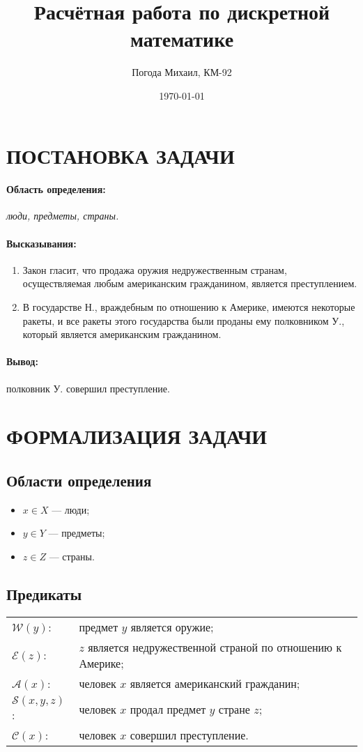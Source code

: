 \documentclass[titlepage,10pt,a4paper]{article}
\title{Расчётная работа по дискретной математике}
\date{\today}
\author{Погода Михаил, КМ-92}
\begin{document}
\maketitle
\newpage
\tableofcontents
\newpage
\section{ПОСТАНОВКА ЗАДАЧИ}
\paragraph{Область определения: }
\textit{люди, предметы, страны.}
\paragraph{Высказывания: }
\begin{enumerate}
\item Закон гласит, что продажа оружия недружественным странам, осуществляемая любым американским гражданином, является преступлением.
\item В государстве Н., враждебным по отношению к Америке, имеются некоторые ракеты, и все ракеты этого государства были проданы ему полковником У., который является американским гражданином.
\end{enumerate}
\paragraph{Вывод: }
полковник У. совершил преступление.

\section{ФОРМАЛИЗАЦИЯ ЗАДАЧИ}
\subsection{Области определения}
\begin{itemize}
\item $x\in X$ --- люди;
\item $y\in Y$ --- предметы;
\item $z\in Z$ --- страны.
\end{itemize}
\subsection{Предикаты}
\begin{tabular}{ll}
$\mathcal{W}\left(y\right)$: &  предмет $y$ является оружие;\\
$\mathcal{E}\left(z\right)$: &  $z$ является недружественной страной по отношению к Америке;\\
$\mathcal{A}\left(x\right)$: & человек $x$ является американский гражданин;\\
$\mathcal{S}\left(x,y,z\right)$: & человек $x$ продал предмет $y$ стране $z$;\\
$\mathcal{C}\left(x\right)$: & человек $x$ совершил преступление.
\end{tabular}
\end{document}
